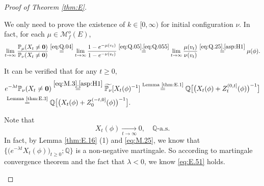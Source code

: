 \documentclass[12pt,a4paper]{amsart}
\numberwithin{equation}{section}
\theoremstyle{plain}
\theoremstyle{definition}
\theoremstyle{remark}
\newenvironment{proof*}[1][\proofname]{
	\renewcommand\qedsymbol{\rule{3mm}{3mm}}
	\begin{proof}[#1]}{\end{proof}}
\begin{document}
\begin{proof}[Proof of Theorem \ref{thm:E}] ${}$
\begin{proof*}[Proof of the existence of $k\in [0,\infty)$.]
	We only need to prove the existence of $k\in [0,\infty)$ for initial configuration $\nu$.
	In fact, for each $\mu\in \mathcal M_f^o(E)$,
\begin{align}
	\lim_{t\to \infty}\frac{\mathbb P_\mu(X_t \neq \mathbf 0)}{\mathbb P_\nu(X_t \neq \mathbf 0)}
	\overset{\eqref{eq:Q.04}} = \lim_{t\to \infty}\frac{1- e^{-\mu(v_t)}}{1- e^{-\nu(v_t)}}
	\overset{\eqref{eq:Q.05}, \eqref{eq:Q.055}} = \lim_{t\to \infty}\frac{\mu(v_t)}{\nu(v_t)}
	\overset{\eqref{eq:Q.25}, \eqref{asp:H1}} = \mu(\phi). 
\end{align}

	It can be verified that for any $t\geq 0,$
	\begin{align}\label{eq:E.5}
	&e^{-\lambda t}\mathbb P_\nu(X_t\neq \mathbf 0)
	\overset{\eqref{eq:M.3}, \eqref{asp:H1}}= \widetilde{\mathbb P_\nu}[X_t(\phi)^{-1}]
	\overset{\text{Lemma \ref{thm:E.1}}}=\mathbb Q\big[ \big(X_t(\phi) +Z^{(0,t]}_t(\phi)\big)^{-1}\big]
	\\&\overset{\text{Lemma \ref{thm:E.3}}}=\mathbb Q\big[ \big(X_t(\phi) +Z^{(-t,0]}_0(\phi)\big)^{-1}\big].
	\end{align}
	
	Note that  
\begin{equation}\label{eq:E.51}
	X_t(\phi) \xrightarrow[t\to \infty]{} 0, \quad \mathbb Q\text{-a.s.}
\end{equation}
	In fact, by Lemma \ref{thm:E.16} (1) and \eqref{eq:M.25}, we know that $\big\{\big(e^{-\lambda t} X_t(\phi)\big)_{t\geq 0}; \mathbb Q\big\}$ is a non-negative martingale. 
	So according to martingale convergence theorem and the fact that $\lambda < 0$, we know \eqref{eq:E.51} holds.


\end{proof*}
\end{proof}
\end{document}
